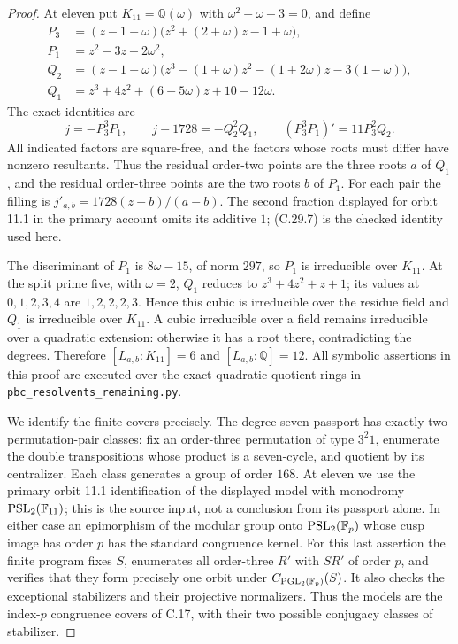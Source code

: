 \begin{proof}
At eleven put $K_{11}=\mathbb Q(\omega)$ with
$\omega^2-\omega+3=0$, and define
\[
 \begin{aligned}
 P_3&=(z-1-\omega)
            \bigl(z^2+(2+\omega)z-1+\omega\bigr),\\
 P_1&=z^2-3z-2\omega^2,\\
 Q_2&=(z-1+\omega)
       \bigl(z^3-(1+\omega)z^2-(1+2\omega)z-3(1-\omega)\bigr),\\
 Q_1&=z^3+4z^2+(6-5\omega)z+10-12\omega .
 \end{aligned}
 \tag{C.29.6}
\]
The exact identities are
\[
       j=-P_3^3P_1,\qquad
       j-1728=-Q_2^2Q_1,\qquad
       (P_3^3P_1)'=11P_3^2Q_2.
 \tag{C.29.7}
\]
All indicated factors are square-free, and the factors
whose roots must differ have nonzero resultants.
Thus the residual order-two points are the three
roots $a$ of $Q_1$, and the residual order-three
points are the two roots $b$ of $P_1$. For each
pair the filling is $j'_{a,b}=1728(z-b)/(a-b)$.
The second fraction displayed for orbit 11.1 in the
primary account omits its additive $1$; (C.29.7)
is the checked identity used here.

The discriminant of $P_1$ is $8\omega-15$, of
norm $297$, so $P_1$ is irreducible over $K_{11}$.
At the split prime five, with $\omega=2$, $Q_1$
reduces to $z^3+4z^2+z+1$; its values at
$0,1,2,3,4$ are $1,2,2,2,3$. Hence this cubic
is irreducible over the residue field and $Q_1$
is irreducible over $K_{11}$.
A cubic irreducible over a field remains irreducible
over a quadratic extension: otherwise it has a root
there, contradicting the degrees. Therefore
$[L_{a,b}:K_{11}]=6$ and $[L_{a,b}:\mathbb Q]=12$.
All symbolic assertions in this proof are executed
over the exact quadratic quotient rings in
\texttt{pbc\_resolvents\_\allowbreak remaining.py}.

We identify the finite covers precisely. The degree-seven
passport has exactly two permutation-pair classes:
fix an order-three permutation of type $3^2 1$,
enumerate the double transpositions whose product is
a seven-cycle, and quotient by its centralizer.
Each class generates a group of order $168$.
At eleven we use the primary orbit 11.1 identification
of the displayed model with monodromy
$\operatorname{PSL}_2(\mathbb F_{11})$; this is the source input,
not a conclusion from its passport alone.
In either case an epimorphism of the modular group
onto $\operatorname{PSL}_2(\mathbb F_p)$ whose cusp image has
order $p$ has the standard congruence kernel.
For this last assertion the finite program fixes
$S$, enumerates all order-three $R'$ with $SR'$
of order $p$, and verifies that they form precisely
one orbit under $C_{\operatorname{PGL}_2(\mathbb F_p)}(S)$.
It also checks the exceptional stabilizers and their
projective normalizers. Thus the models are the
index-$p$ congruence covers of C.17, with their two
possible conjugacy classes of stabilizer.


\end{proof}
